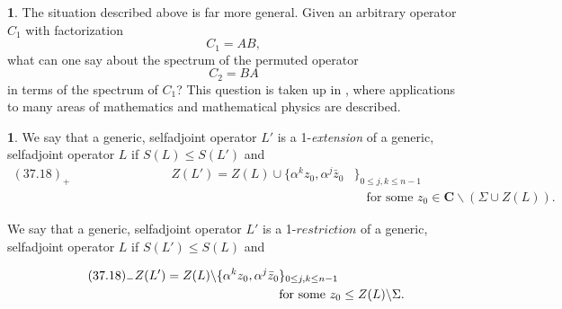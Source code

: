 \documentclass{surv-l}
\theoremstyle{plain}
\theoremstyle{definition}
\newtheorem{remark}[theorem]{\sc{Remark}}
\newtheorem{definition}[theorem]{\sc{Definition}}
\numberwithin{equation}{chapter}
\begin{document}
\renewcommand\thetheorem{\thesection.\arabic{theorem}}
\setcounter{section}{37}
\setcounter{theorem}{16}
\begin{remark}\label{rem37.17} The situation described above is far more general. Given an arbitrary operator $C_{1}$ with factorization
\begin{equation*}
C_{1}=AB,
\end{equation*}
what can one say about the spectrum of the permuted operator
\begin{equation*}
C_{2}=BA
\end{equation*}
in terms of the spectrum of $C_{1}$? This question is taken up in \cite{De}, where applications to many areas of mathematics and mathematical physics are described.
\end{remark}

\begin{definition}\label{def37.18} We say that a generic, selfadjoint operator $L'$ is a 1-\emph{extension} of a generic, selfadjoint operator $L$ if $S(L)\leq S(L')$ and
\renewcommand\theequation{37.18$_{+}$}
\begin{align*}
(37.18)_{+}\qquad\qquad\qquad\qquad Z(L')=Z(L)\cup\{\alpha^{k}z_{0},\alpha^{j}\bar{z}_{0}&\}_{0\leq j,k\leq n-1}\\
&\quad \text{for some }z_{0}\in \mathbf{C}\backslash (\Sigma\cup Z(L)).\nonumber
\end{align*}

We say that a generic, selfadjoint operator $L'$ is a 1-$restriction$ of a generic, selfadjoint operator $L$ if $S(L')\leq S(L)$ and

\begin{align*}
\tag*{$(37.18)_{-}$} Z(L')=Z(L)\backslash \{\alpha^{k}z_{0},\alpha^{j}\bar{z}_{0}&\}_{0\leq j,k\leq n-1}\\
&\text{for some }z_{0}\leq Z(L)\backslash \Sigma.
\end{align*}
 \end{definition}
\setcounter{theorem}{18}
\end{document}

